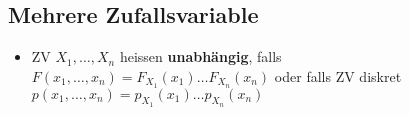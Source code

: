 \subsection{Mehrere Zufallsvariable}
\begin{itemize}
        \begin{itemize}
            \item $F: \R^n \to [0,1]$
            \item $F(x_1, \dots, x_n) := P[X_1 \le x_1, \dots, X_n \le x_n]$ für $X_1, \dots, X_n$ ZV
        \end{itemize}
        \begin{itemize}
            \item $p: \R^n \to [0,1]$
            \item $p(x_1, \dots, x_n) := P[X_1 = x_1, \dots, X_n = x_n]$ für $X_1, \dots, X_n$ diskrete ZV
        \end{itemize}
        \begin{itemize}
            \item Sofern $X$ und $Y$ gemeinsame VF $F$ haben
            \item $F_X: \R \to [0,1]$
            \item $F_X(x) := P[X \le x] = \lim_{y \to \infty} P[X \le x, Y < y] = \lim_{y \to \infty} F(x, y)$
        \end{itemize}
        \begin{itemize}
            \item $p_X: \mc{W}(X) \to [0,1]$
            \item $p_x(x) = P[X = x] = \sum_{y_j \in \mc{W}(Y)} P[X = x, Y = y_j] = \sum_{y_j \in \mc{W}(Y)} p(x, y_j)$
        \end{itemize}
    \item ZV $X_1, \dots, X_n$ heissen \textbf{unabhängig}, falls $F(x_1, \dots, x_n) = F_{X_1}(x_1) \dots F_{X_n}(x_n)$ oder falls ZV diskret $p(x_1, \dots, x_n) = p_{X_1}(x_1) \dots p_{X_n}(x_n)$
\end{itemize}

